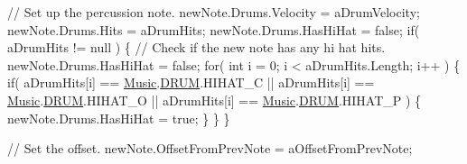 \begin{DoxyCodeInclude}
        \textcolor{comment}{// Set up the percussion note.}
        newNote.Drums.Velocity = aDrumVelocity;
        newNote.Drums.Hits = aDrumHits;
        newNote.Drums.HasHiHat = \textcolor{keyword}{false};
        \textcolor{keywordflow}{if}( aDrumHits != null )
        \{
            \textcolor{comment}{// Check if the new note has any hi hat hits.}
            newNote.Drums.HasHiHat = \textcolor{keyword}{false};
            \textcolor{keywordflow}{for}( \textcolor{keywordtype}{int} i = 0; i < aDrumHits.Length; i++ )
            \{
                \textcolor{keywordflow}{if}( aDrumHits[i] == \hyperlink{class_music}{Music}.\hyperlink{group___music_enums_gade475b4382c7066d1af13e7c13c029b6}{DRUM}.HIHAT\_C ||
                    aDrumHits[i] == \hyperlink{class_music}{Music}.\hyperlink{group___music_enums_gade475b4382c7066d1af13e7c13c029b6}{DRUM}.HIHAT\_O ||
                    aDrumHits[i] == \hyperlink{class_music}{Music}.\hyperlink{group___music_enums_gade475b4382c7066d1af13e7c13c029b6}{DRUM}.HIHAT\_P )
                \{
                    newNote.Drums.HasHiHat = \textcolor{keyword}{true};
                \}
            \}
        \}

        \textcolor{comment}{// Set the offset.}
        newNote.OffsetFromPrevNote = aOffsetFromPrevNote;


\end{DoxyCodeInclude}
